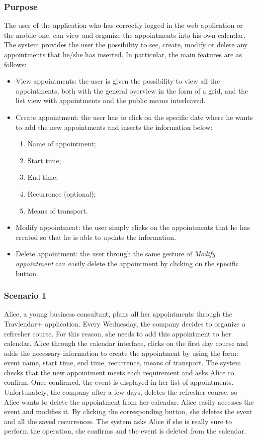 \subsubsection{Purpose}
The user of the application who has correctly logged in the web application or the mobile one, can view and organize the appointments into his own calendar. The system provides the user the possibility to see, create, modify or delete any appointments that he/she has inserted. In particular, the main features are as follows:
\begin{itemize}
\item View appointments: the user is given the possibility to view all the appointments, both with the general overview in the form of a grid, and the list view with appointments and the public means interleaved.
\item Create appointment: the user has to click on the specific date where he wants to add the new appointments and inserts the information below:
        \begin{enumerate}
        \item Name of appointment;
        \item Start time;
        \item End time;
        \item Recurrence (optional);
        \item Means of transport.
        \end{enumerate}
\item Modify appointment: the user simply clicks on the appointments that he has created so that he is able to update the information.
\item Delete appointment: the user through the same gesture of \textit{Modify appointment} can easily delete the appointment by clicking on the specific button.
\end{itemize}

\subsubsection{Scenario 1}
Alice, a young business consultant, plans all her appointments through the Travlendar+ application. Every Wednesday, the company decides to organize a refresher course. For this reason, she needs to add this appointment to her calendar.
Alice through the calendar interface, clicks on the first day course and adds the necessary information to create the appointment by using the form: event name, start time, end time, recurrence, means of transport. The system checks that the new appointment meets each requirement and asks Alice to confirm. Once confirmed, the event is displayed in her list of appointments. Unfortunately, the company after a few days, deletes the refresher course, so Alice wants to delete the appointment from her calendar. Alice easily accesses the event and modifies it. By clicking the corresponding button, she deletes the event and all the saved recurrences. The system asks Alice if she is really sure to perform the operation, she confirms and the event is deleted from the calendar.

